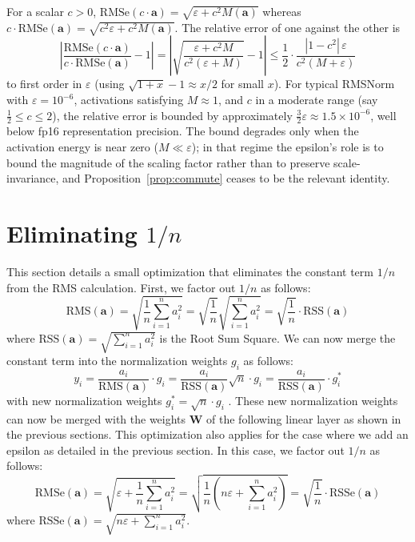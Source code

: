 \documentclass{article}
\newcommand{\mat}[1]{\mathbf{#1}}     %
\def\rms{\text{RMS}(\mathbf{a})}      %
\def\f1n{\frac{1}{n}}                 %
\def\sas{\sum_{i=1}^n a_i^2}           %
\def\a{\mathbf{a}}                    %
\begin{document}
For a scalar $c > 0$, $\mathrm{RMSe}(c\cdot\mathbf{a}) = \sqrt{\varepsilon + c^2 M(\mathbf{a})}$ whereas $c\cdot\mathrm{RMSe}(\mathbf{a}) = \sqrt{c^2 \varepsilon + c^2 M(\mathbf{a})}$. The relative error of one against the other is
\begin{equation*}
  \left| \frac{\mathrm{RMSe}(c\cdot\mathbf{a})}{c\cdot\mathrm{RMSe}(\mathbf{a})} - 1 \right|
  = \left| \sqrt{\frac{\varepsilon + c^2 M}{c^2 (\varepsilon + M)}} - 1 \right|
  \leq \frac{1}{2} \cdot \frac{|1 - c^2|\,\varepsilon}{c^2 (M + \varepsilon)}
\end{equation*}
to first order in $\varepsilon$ (using $\sqrt{1+x} - 1 \approx x/2$ for small $x$). For typical RMSNorm with $\varepsilon = 10^{-6}$, activations satisfying $M \approx 1$, and $c$ in a moderate range (say $\tfrac{1}{2} \leq c \leq 2$), the relative error is bounded by approximately $\tfrac{3}{2}\varepsilon \approx 1.5 \times 10^{-6}$, well below fp16 representation precision. The bound degrades only when the activation energy is near zero ($M \ll \varepsilon$); in that regime the epsilon's role is to bound the magnitude of the scaling factor rather than to preserve scale-invariance, and Proposition~\ref{prop:commute} ceases to be the relevant identity.

\section{Eliminating $1/n$}
This section details a small optimization that eliminates the constant term $1/n$ from the RMS calculation. First, we factor out $1/n$ as follows:
\begin{equation*}
  \rms = \sqrt{\f1n \sas} = \sqrt{\f1n} \sqrt{\sas} = \sqrt{\f1n} \cdot \text{RSS}(\a)
\end{equation*}
where $\text{RSS}(\a) = \sqrt{\sas}$ is the Root Sum Square. We can now merge the constant term into the normalization weights $g_i$ as follows:
\begin{equation*}
  y_i = \frac{a_i}{\rms} \cdot g_i =
  \frac{a_i}{\text{RSS}(\a)} \sqrt{n} \cdot g_i =
  \frac{a_i}{\text{RSS}(\a)}          \cdot g_i^\ast
\end{equation*}
with new normalization weights $g_i^\ast = \sqrt{n} \cdot g_i$ . These new normalization weights can now be merged with the weights $\mat{W}$ of the following linear layer as shown in the previous sections. This optimization also applies for the case where we add an epsilon as detailed in the previous section. In this case, we factor out $1/n$ as follows:
\begin{equation*}
  \text{RMSe}(\a) = \sqrt{\varepsilon + \f1n \sas}
  = \sqrt{\f1n \left( n \varepsilon + \sas \right)}
  = \sqrt{\f1n} \cdot \text{RSSe}(\a)
\end{equation*}
where $\text{RSSe}(\a) = \sqrt{n \varepsilon + \sas}$.
\end{document}
